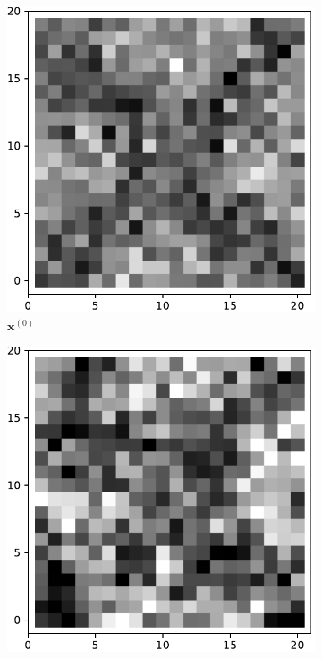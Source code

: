    \begin{figure}[!h]
        \centering
        \begin{subfigure}[b]{0.24\textwidth}
            \centering
            \includegraphics[width=\textwidth]{./img/ximage.pdf}
            \caption[]%
            {{\small $\mathbf{x}^{(0)}$}}    
            \label{fig:ximage4}
        \end{subfigure}
        \begin{subfigure}[b]{0.24\textwidth}  
            \centering 
            \includegraphics[width=\textwidth]{./img/15d1-0.pdf}

\end{subfigure}
\end{figure}
